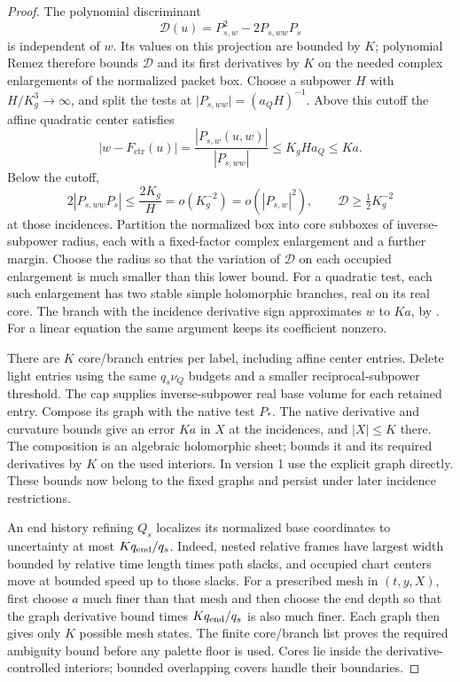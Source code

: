 \begin{proof}
The polynomial discriminant
\[
 \mathcal D(u)=P_{s,w}^2-2P_{s,ww}P_s
\]
is independent of \(w\).  Its values on this projection are bounded
by \(K\); polynomial Remez therefore bounds \(\mathcal D\) and
its first derivatives by \(K\) on the needed complex enlargements
of the normalized packet box.  Choose a subpower \(H\) with
\(H/K_g^3\to\infty\), and split the tests at
\(\lvert P_{s,ww}\rvert=(a_QH)^{-1}\).
Above this cutoff the affine quadratic center satisfies
\[
 |w-F_{\mathrm{ctr}}(u)|
   =\frac{|P_{s,w}(u,w)|}{|P_{s,ww}|}
   \le K_gHa_Q\le Ka.
\]
Below the cutoff,
\begin{equation}
 2|P_{s,ww}P_s|\le \frac{2K_g}{H}
       =o(K_g^{-2})=o(|P_{s,w}|^2),
 \qquad \mathcal D\ge\tfrac12K_g^{-2}
 \label{a03:palette-discriminant}
\end{equation}
at those incidences.  Partition the normalized box into core
subboxes of inverse-subpower radius, each with a fixed-factor
complex enlargement and a further margin.  Choose the radius so
that the variation of \(\mathcal D\) on each occupied enlargement
is much smaller than this lower bound.  For a quadratic test, each
such enlargement has two stable simple holomorphic branches, real
on its real core.
The branch with the incidence derivative sign approximates \(w\)
to \(Ka\), by .  For a linear
equation the same argument keeps its coefficient nonzero.

There are \(K\) core/branch entries per label, including affine
center entries.  Delete light entries using the same
\(q_s\nu_Q\) budgets and a smaller reciprocal-subpower threshold.
The cap  supplies inverse-subpower real
base volume for each retained entry.  Compose its graph with the
native test \(P_*\).  The native derivative and curvature bounds
give an error \(Ka\) in \(X\) at the incidences, and \(|X|\le K\)
there.  The composition is an algebraic holomorphic sheet;
 bounds it and its required derivatives
by \(K\) on the used interiors.  In version 1 use the explicit
graph directly.  These bounds now belong to the fixed graphs and
persist under later incidence restrictions.

An end history refining \(Q_s\) localizes its normalized base
coordinates to uncertainty at most \(Kq_{\rm end}/q_s\).
Indeed, nested relative frames have largest width bounded by
relative time length times path slacks, and occupied chart centers
move at bounded speed up to those slacks.  For a prescribed mesh
in \((t,y,X)\), first choose \(a\) much finer than that mesh and
then choose the end depth so that the graph derivative bound times
\(Kq_{\rm end}/q_s\) is also much finer.  Each graph then gives
only \(K\) possible mesh states.  The finite core/branch list
proves the required ambiguity bound before any palette floor is
used.  Cores lie inside the derivative-controlled interiors;
bounded overlapping covers handle their boundaries.


\end{proof}
